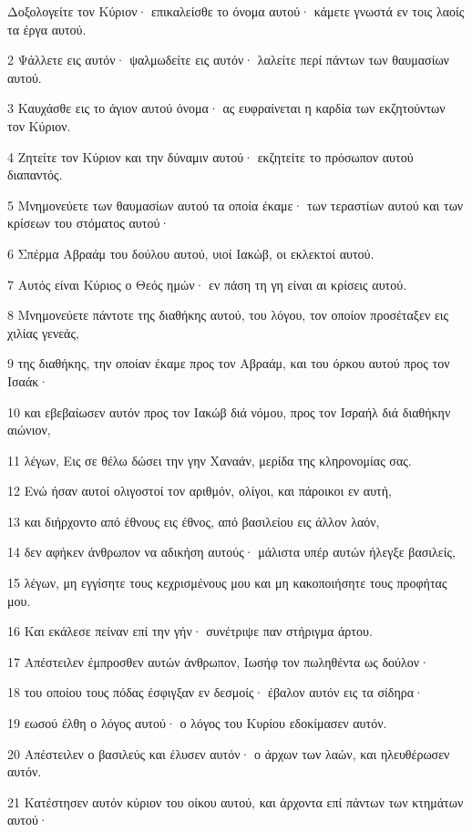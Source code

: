 \par Δοξολογείτε τον Κύριον· επικαλείσθε το όνομα αυτού· κάμετε γνωστά εν τοις λαοίς τα έργα αυτού.
\par 2 Ψάλλετε εις αυτόν· ψαλμωδείτε εις αυτόν· λαλείτε περί πάντων των θαυμασίων αυτού.
\par 3 Καυχάσθε εις το άγιον αυτού όνομα· ας ευφραίνεται η καρδία των εκζητούντων τον Κύριον.
\par 4 Ζητείτε τον Κύριον και την δύναμιν αυτού· εκζητείτε το πρόσωπον αυτού διαπαντός.
\par 5 Μνημονεύετε των θαυμασίων αυτού τα οποία έκαμε· των τεραστίων αυτού και των κρίσεων του στόματος αυτού·
\par 6 Σπέρμα Αβραάμ του δούλου αυτού, υιοί Ιακώβ, οι εκλεκτοί αυτού.
\par 7 Αυτός είναι Κύριος ο Θεός ημών· εν πάση τη γη είναι αι κρίσεις αυτού.
\par 8 Μνημονεύετε πάντοτε της διαθήκης αυτού, του λόγου, τον οποίον προσέταξεν εις χιλίας γενεάς,
\par 9 της διαθήκης, την οποίαν έκαμε προς τον Αβραάμ, και του όρκου αυτού προς τον Ισαάκ·
\par 10 και εβεβαίωσεν αυτόν προς τον Ιακώβ διά νόμου, προς τον Ισραήλ διά διαθήκην αιώνιον,
\par 11 λέγων, Εις σε θέλω δώσει την γην Χαναάν, μερίδα της κληρονομίας σας.
\par 12 Ενώ ήσαν αυτοί ολιγοστοί τον αριθμόν, ολίγοι, και πάροικοι εν αυτή,
\par 13 και διήρχοντο από έθνους εις έθνος, από βασιλείου εις άλλον λαόν,
\par 14 δεν αφήκεν άνθρωπον να αδικήση αυτούς· μάλιστα υπέρ αυτών ήλεγξε βασιλείς,
\par 15 λέγων, μη εγγίσητε τους κεχρισμένους μου και μη κακοποιήσητε τους προφήτας μου.
\par 16 Και εκάλεσε πείναν επί την γήν· συνέτριψε παν στήριγμα άρτου.
\par 17 Απέστειλεν έμπροσθεν αυτών άνθρωπον, Ιωσήφ τον πωληθέντα ως δούλον·
\par 18 του οποίου τους πόδας έσφιγξαν εν δεσμοίς· έβαλον αυτόν εις τα σίδηρα·
\par 19 εωσού έλθη ο λόγος αυτού· ο λόγος του Κυρίου εδοκίμασεν αυτόν.
\par 20 Απέστειλεν ο βασιλεύς και έλυσεν αυτόν· ο άρχων των λαών, και ηλευθέρωσεν αυτόν.
\par 21 Κατέστησεν αυτόν κύριον του οίκου αυτού, και άρχοντα επί πάντων των κτημάτων αυτού·
